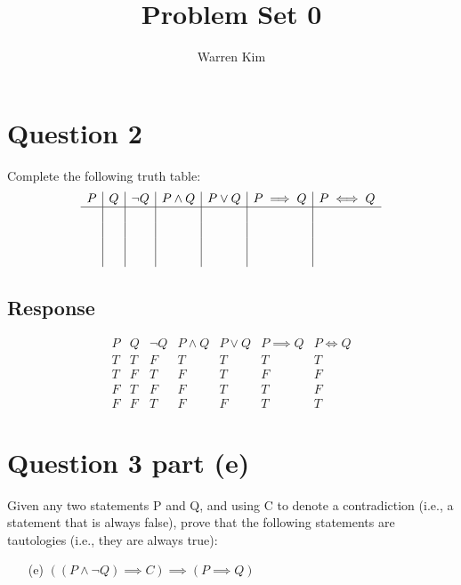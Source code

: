 \documentclass[13pt]{article}
\title{Problem Set 0}
\author{Warren Kim}
\begin{document}
\maketitle

\newpage
\section*{Question 2}
Complete the following truth table:
\[
  \begin{array}{c|c|c|c|c|c|c}
    P & Q & \neg Q & P \land Q & P \lor Q & P \implies Q & P \iff Q \\
    \hline
      &  &  &  &  &  &  \\
      &  &  &  &  &  &  \\
      &  &  &  &  &  &  \\
      &  &  &  &  &  & 
  \end{array}
\]

\subsection*{Response}
\[
  \begin{array}{c|c|c|c|c|c|c}
    P & Q & \neg Q & P \land Q & P \lor Q & P \implies Q & P \iff Q \\
    \hline
    T & T & F & T & T & T & T \\
    T & F & T & F & T & F & F \\
    F & T & F & F & T & T & F \\
    F & F & T & F & F & T & T
  \end{array}
\]





\newpage
\section*{Question 3 part (e)}
Given any two statements P and Q, and using C to denote a contradiction (i.e., a
statement that is always false), prove that the following statements are tautologies (i.e.,
they are always true):
\begin{enumerate}
\item [(e)] $((P \land \neg Q) \implies C) \implies (P \implies Q)$
\end{enumerate}
\end{document}
